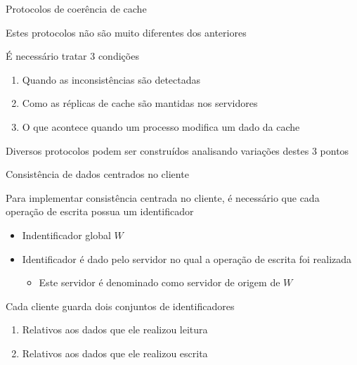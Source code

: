 \documentclass[compress]{beamer}
\begin{document}
\begin{frame}{Protocolos de coerência de cache}

Estes protocolos não são muito diferentes dos anteriores

\vspace{0.5cm}

É necessário tratar 3 condições
\begin{enumerate}
    \item Quando as inconsistências são detectadas
    \item Como as réplicas de cache são mantidas nos servidores
    \item O que acontece quando um processo modifica um dado da cache
\end{enumerate}

\vspace{0.5cm}

Diversos protocolos podem ser construídos analisando variações destes 3 pontos

\end{frame}


\begin{frame}{Consistência de dados centrados no cliente}

Para implementar consistência centrada no cliente, é necessário que cada operação de escrita possua um identificador
\begin{itemize}
    \item Indentificador global $W$
    \item Identificador é dado pelo servidor no qual a operação de escrita foi realizada
    \begin{itemize}
        \item Este servidor é denominado como servidor de origem de $W$
    \end{itemize}
\end{itemize}

\vspace{0.5cm}

Cada cliente guarda dois conjuntos de identificadores
\begin{enumerate}
    \item Relativos aos dados que ele realizou leitura
    \item Relativos aos dados que ele realizou escrita
\end{enumerate}
    
\end{frame}
\end{document}
